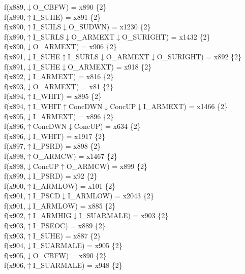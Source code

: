 f(x889,$\downarrow$O\_CBFW) = x890 \{2\} \\  
f(x890,$\uparrow$I\_SUHE) = x891 \{2\} \\  
f(x890,$\uparrow$I\_SUILS$\downarrow$O\_SUDWN) = x1230 \{2\} \\  
f(x890,$\uparrow$I\_SURLS$\downarrow$O\_ARMEXT$\downarrow$O\_SURIGHT) = x1432 \{2\} \\  
f(x890,$\downarrow$O\_ARMEXT) = x906 \{2\} \\  
f(x891,$\downarrow$I\_SUHE$\uparrow$I\_SURLS$\downarrow$O\_ARMEXT$\downarrow$O\_SURIGHT) = x892 \{2\} \\  
f(x891,$\downarrow$I\_SUHE$\downarrow$O\_ARMEXT) = x918 \{2\} \\  
f(x892,$\downarrow$I\_ARMEXT) = x816 \{2\} \\  
f(x893,$\downarrow$O\_ARMEXT) = x81 \{2\} \\  
f(x894,$\uparrow$I\_WHIT) = x895 \{2\} \\  
f(x894,$\uparrow$I\_WHIT$\uparrow$ConcDWN$\downarrow$ConcUP$\downarrow$I\_ARMEXT) = x1466 \{2\} \\  
f(x895,$\downarrow$I\_ARMEXT) = x896 \{2\} \\  
f(x896,$\uparrow$ConcDWN$\downarrow$ConcUP) = x634 \{2\} \\  
f(x896,$\downarrow$I\_WHIT) = x1917 \{2\} \\  
f(x897,$\uparrow$I\_PSRD) = x898 \{2\} \\  
f(x898,$\uparrow$O\_ARMCW) = x1467 \{2\} \\  
f(x898,$\downarrow$ConcUP$\uparrow$O\_ARMCW) = x899 \{2\} \\  
f(x899,$\downarrow$I\_PSRD) = x92 \{2\} \\  
f(x900,$\uparrow$I\_ARMLOW) = x101 \{2\} \\  
f(x901,$\uparrow$I\_PSCD$\downarrow$I\_ARMLOW) = x2043 \{2\} \\  
f(x901,$\downarrow$I\_ARMLOW) = x885 \{2\} \\  
f(x902,$\uparrow$I\_ARMHIG$\downarrow$I\_SUARMALE) = x903 \{2\} \\  
f(x903,$\uparrow$I\_PSEOC) = x889 \{2\} \\  
f(x903,$\uparrow$I\_SUHE) = x887 \{2\} \\  
f(x904,$\downarrow$I\_SUARMALE) = x905 \{2\} \\  
f(x905,$\downarrow$O\_CBFW) = x890 \{2\} \\  
f(x906,$\uparrow$I\_SUARMALE) = x948 \{2\} \\  
